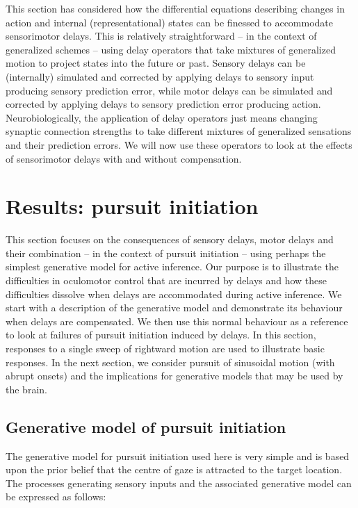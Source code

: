 \documentclass[a4paper]{article} %
\begin{document}
This section has considered how the differential equations describing
changes in action and internal (representational) states can be finessed
to accommodate sensorimotor delays. This is relatively straightforward
-- in the context of generalized schemes -- using delay operators that
take mixtures of generalized motion to project states into the future or
past. Sensory delays can be (internally) simulated and corrected by
applying delays to sensory input producing sensory prediction error,
while motor delays can be simulated and corrected by applying delays to
sensory prediction error producing action. Neurobiologically, the
application of delay operators just means changing synaptic connection
strengths to take different mixtures of generalized sensations and their
prediction errors. We will now use these operators to look at the
effects of sensorimotor delays with and without compensation.



\section{Results: pursuit initiation}
\label{sec:pursuit}
This section focuses on the consequences of sensory delays, motor delays
and their combination -- in the context of pursuit initiation -- using
perhaps the simplest generative model for active inference. Our purpose
is to illustrate the difficulties in oculomotor control that are
incurred by delays and how these difficulties dissolve when delays are
accommodated during active inference. We start with a description of the
generative model and demonstrate its behaviour when delays are
compensated. We then use this normal behaviour as a reference to look at
failures of pursuit initiation induced by delays. In this section,
responses to a single sweep of rightward motion are used to illustrate
basic responses. In the next section, we consider pursuit of sinusoidal
motion (with abrupt onsets) and the implications for generative models
that may be used by the brain.

\subsection{Generative model of pursuit initiation}

The generative model for pursuit initiation used here is very simple and
is based upon the prior belief that the centre of gaze is attracted to
the target location. The processes generating sensory inputs and the
associated generative model can be expressed as follows:
\end{document}
